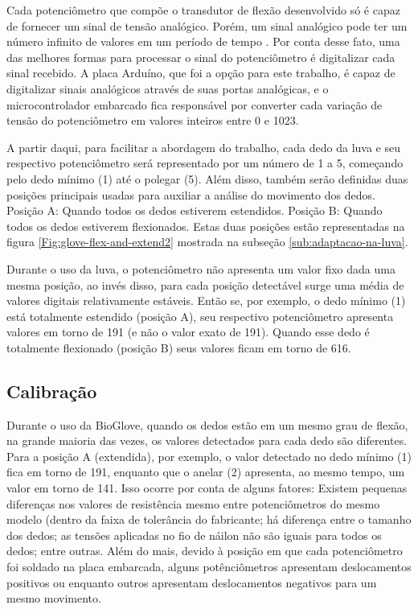\documentclass[
	12pt,				%
	openright,			%
	oneside,			%
	a4paper,			%
	english,			%
	brazil				%
	]{abntex2}
\begin{document}
		Cada potenciômetro que compõe o transdutor de flexão desenvolvido só é capaz de fornecer um sinal de tensão analógico. Porém, um sinal analógico pode ter um número infinito de valores em um período de tempo \cite{forouzan2009comunicacao}. Por conta desse fato, uma das melhores formas para processar o sinal do potenciômetro é digitalizar cada sinal recebido. A placa Arduíno, que foi a opção para este trabalho, é capaz de digitalizar sinais analógicos através de suas portas analógicas, e o microcontrolador embarcado fica responsável por converter cada variação de tensão do potenciômetro em valores inteiros entre 0 e 1023. 

		A partir daqui, para facilitar a abordagem do trabalho, cada dedo da luva e seu respectivo potenciômetro será representado por um número de 1 a 5, começando pelo dedo mínimo (1) até o polegar (5). Além disso, também serão definidas duas posições principais usadas para auxiliar a análise do movimento dos dedos. Posição A: Quando todos os dedos estiverem estendidos. Posição B: Quando todos os dedos estiverem flexionados. Estas duas posições estão representadas na figura \ref{Fig:glove-flex-and-extend2} mostrada na subseção \ref{sub:adaptacao-na-luva}.

		Durante o uso da luva, o potenciômetro não apresenta um valor fixo dada uma mesma posição, ao invés disso, para cada posição detectável surge uma média de valores digitais relativamente estáveis. Então se, por exemplo, o dedo mínimo (1) está totalmente estendido (posição A), seu respectivo potenciômetro apresenta valores em torno de 191 (e não o valor exato de 191). Quando esse dedo é totalmente flexionado (posição B) seus valores ficam em torno de 616.

				
		\subsection{Calibração}


		Durante o uso da BioGlove, quando os dedos estão em um mesmo grau de flexão, na grande maioria das vezes, os valores detectados para cada dedo são diferentes. Para a posição A (extendida), por exemplo, o valor detectado no dedo mínimo (1) fica em torno de 191, enquanto que o anelar (2) apresenta, ao mesmo tempo, um valor em torno de 141. Isso ocorre por conta de alguns fatores: Existem pequenas diferenças nos valores de resistência mesmo entre potenciômetros do mesmo modelo (dentro da faixa de tolerância do fabricante; há diferença entre o tamanho dos dedos; as tensões aplicadas no fio de náilon não são iguais para todos os dedos; entre outras. Além do mais, devido à posição em que cada potenciômetro foi soldado na placa embarcada, alguns potênciômetros apresentam deslocamentos positivos ou enquanto outros apresentam deslocamentos negativos para um mesmo movimento.
		
\end{document}
